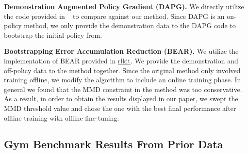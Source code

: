 \documentclass[conference]{IEEEtran}
\begin{document}
\textbf{Demonstration Augmented Policy Gradient (DAPG).} We directly utilize the code provided in ~\citep{rajeswaran2018dextrous} to compare against our method. Since DAPG is an on-policy method, we only provide the demonstration data to the DAPG code to bootstrap the initial policy from.



\textbf{Bootstrapping Error Accumulation Reduction (BEAR).} We utilize the implementation of BEAR provided in \href{https://github.com/vitchyr/rlkit}{rlkit}. We provide the demonstration and off-policy data to the method together. Since the original method only involved training offline, we modify the algorithm to include an online training phase. In general we found that the MMD constraint in the method was too conservative. As a result, in order to obtain the results displayed in our paper, we swept the MMD threshold value and chose the one with the best final performance after offline training with offline fine-tuning.



\subsection{Gym Benchmark Results From Prior Data}
\label{sec:gym}
\end{document}
